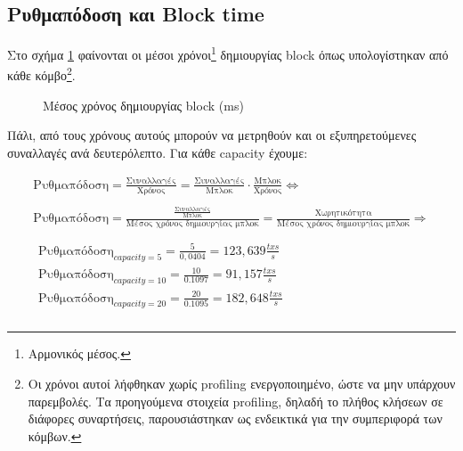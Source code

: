 \documentclass{article}
\newcommand{\eng}[1]{\foreignlanguage{english}{#1}} %
\begin{document}
\clearpage
\subsection{Ρυθμαπόδοση και \eng{Block time}}

Στο σχήμα \ref{fig:scalability-blocktimes} φαίνονται οι μέσοι
χρόνοι\footnote{Αρμονικός μέσος.} δημιουργίας \eng{block} όπως υπολογίστηκαν
από κάθε κόμβο\footnote{Οι χρόνοι αυτοί λήφθηκαν χωρίς \eng{profiling}
ενεργοποιημένο, ώστε να μην υπάρχουν παρεμβολές. Τα προηγούμενα στοιχεία
\eng{profiling}, δηλαδή το πλήθος κλήσεων σε διάφορες συναρτήσεις,
παρουσιάστηκαν ως ενδεικτικά για την συμπεριφορά των κόμβων.}.

\begin{figure}[ht]
    \centering
    \begin{varwidth}{\linewidth}
        
    \end{varwidth}
    \caption{Μέσος χρόνος δημιουργίας \eng{block} (\eng{ms})}
    \label{fig:scalability-blocktimes}
\end{figure}

Πάλι, από τους χρόνους αυτούς μπορούν να μετρηθούν και οι εξυπηρετούμενες
συναλλαγές ανά δευτερόλεπτο. Για κάθε \eng{capacity} έχουμε:

\begin{equation}
    \begin{gathered}
        \text{Ρυθμαπόδοση} = \frac{\text{Συναλλαγές}}{\text{Χρόνος}} = \frac{\text{Συναλλαγές}}{\text{Μπλοκ}}\cdot \frac{\text{Μπλοκ}}{\text{Χρόνος}} \Leftrightarrow \\
        \\
        \text{Ρυθμαπόδοση} = \frac{\frac{\text{Συναλλαγές}}{\text{Μπλοκ}} }{\text{Μέσος χρόνος δημιουργίας μπλοκ}} = \frac{\text{Χωρητικότητα}}{\text{Μέσος χρόνος δημιουργίας μπλοκ}} \Rightarrow \\
    \\
    \boxed{
        \begin{gathered}
            \text{Ρυθμαπόδοση}_{capacity=5} = \frac{5}{0,0404} = 123,639 \text{} \frac{txs}{s}\\
            \text{Ρυθμαπόδοση}_{capacity=10} = \frac{10}{0.1097} = 91,157 \text{} \frac{txs}{s}\\
            \text{Ρυθμαπόδοση}_{capacity=20} = \frac{20}{0.1095} = 182,648 \text{} \frac{txs}{s}\\
        \end{gathered}
    }
    \end{gathered}
\end{equation}
\end{document}
